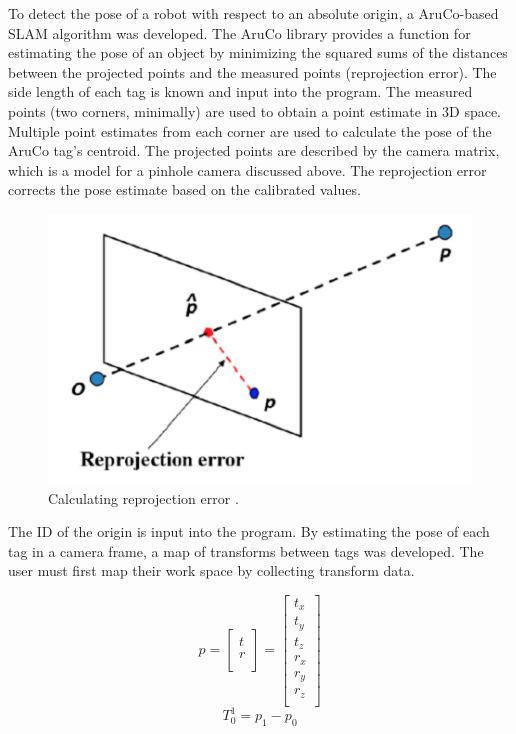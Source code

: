 \documentclass{article}
\begin{document}
    To detect the pose of a robot with respect to an absolute origin, a AruCo-based SLAM algorithm was developed. The AruCo library provides a function for estimating the pose of an object by minimizing the squared sums of the distances between the projected points and the measured points (reprojection error). The side length of each tag is known and input into the program. The measured points (two corners, minimally) are used to obtain a point estimate in 3D space. Multiple point estimates from each corner are used to calculate the pose of the AruCo tag's centroid. The projected points are described by the camera matrix, which is a model for a pinhole camera discussed above. The reprojection error corrects the pose estimate based on the calibrated values.

    \begin{figure}[H]
      \centering
      \includegraphics[width=0.7\linewidth]{./images/reprojection_img.png}
      \caption{Calculating reprojection error \cite{richard_hartley_multiple_2003}.}
      \label{fig:reprojection_img}
    \end{figure}

    The ID of the origin is input into the program. By estimating the pose of each tag in a camera frame, a map of transforms between tags was developed. The user must first map their work space by collecting transform data.

    \begin{equation} \label{eq:PoseDefCamera}
      p =
      \begin{bmatrix}
        t \\
        r \\
      \end{bmatrix}
      =
      \begin{bmatrix}
        t_x \\
        t_y \\
        t_z \\
        r_x \\
        r_y \\
        r_z \\
      \end{bmatrix}
    \end{equation}
    \begin{equation} \label{eq:TransCamera}
      T_0^1 = p_1 - p_0
    \end{equation}
\end{document}
